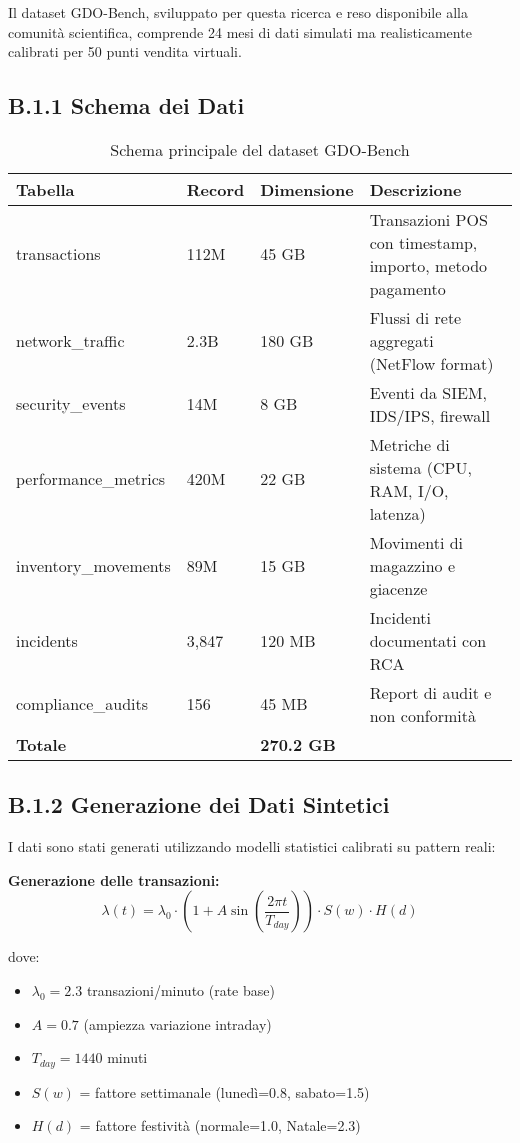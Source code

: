 Il dataset GDO-Bench, sviluppato per questa ricerca e reso disponibile alla comunità scientifica, comprende 24 mesi di dati simulati ma realisticamente calibrati per 50 punti vendita virtuali.

\subsection{B.1.1 Schema dei Dati}

\begin{table}[htbp]
\centering
\caption{Schema principale del dataset GDO-Bench}
\begin{tabular}{|l|l|l|p{5cm}|}
\hline
\textbf{Tabella} & \textbf{Record} & \textbf{Dimensione} & \textbf{Descrizione} \\
\hline
transactions & 112M & 45 GB & Transazioni POS con timestamp, importo, metodo pagamento \\
network\_traffic & 2.3B & 180 GB & Flussi di rete aggregati (NetFlow format) \\
security\_events & 14M & 8 GB & Eventi da SIEM, IDS/IPS, firewall \\
performance\_metrics & 420M & 22 GB & Metriche di sistema (CPU, RAM, I/O, latenza) \\
inventory\_movements & 89M & 15 GB & Movimenti di magazzino e giacenze \\
incidents & 3,847 & 120 MB & Incidenti documentati con RCA \\
compliance\_audits & 156 & 45 MB & Report di audit e non conformità \\
\hline
\textbf{Totale} & & \textbf{270.2 GB} & \\
\hline
\end{tabular}
\end{table}

\subsection{B.1.2 Generazione dei Dati Sintetici}

I dati sono stati generati utilizzando modelli statistici calibrati su pattern reali:

\textbf{Generazione delle transazioni:}
\begin{equation}
\lambda(t) = \lambda_0 \cdot \left(1 + A \sin\left(\frac{2\pi t}{T_{day}}\right)\right) \cdot S(w) \cdot H(d)
\end{equation}

dove:
\begin{itemize}
    \item $\lambda_0 = 2.3$ transazioni/minuto (rate base)
    \item $A = 0.7$ (ampiezza variazione intraday)
    \item $T_{day} = 1440$ minuti
    \item $S(w)$ = fattore settimanale (lunedì=0.8, sabato=1.5)
    \item $H(d)$ = fattore festività (normale=1.0, Natale=2.3)
\end{itemize}

